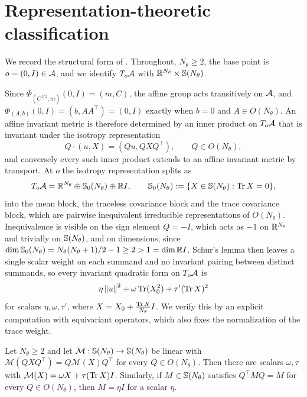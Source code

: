\section{Representation-theoretic classification}\label{app:classification}

We record the structural form of . Throughout, $N_\theta \geq 2$, the base point is $o = (0, I) \in \mathcal{A}$, and we identify $T_o \mathcal{A}$ with $\mathbb{R}^{N_\theta} \times \mathbb{S}(N_\theta)$.

Since $\Phi_{(C^{1/2}, m)}(0, I) = (m, C)$, the affine group acts transitively on $\mathcal{A}$, and $\Phi_{(A,b)}(0, I) = (b, AA^\top) = (0, I)$ exactly when $b = 0$ and $A \in O(N_\theta)$. An affine invariant metric is therefore determined by an inner product on $T_o \mathcal{A}$ that is invariant under the isotropy representation
\begin{equation}\label{eq:app-cl-isotropy}
    Q \cdot (u, X) = (Qu, QXQ^\top), \qquad Q \in O(N_\theta),
\end{equation}
and conversely every such inner product extends to an affine invariant metric by transport. At $o$ the isotropy representation splits as
\begin{equation}\label{eq:app-cl-splitting}
    T_o \mathcal{A} = \mathbb{R}^{N_\theta} \oplus \mathbb{S}_0(N_\theta) \oplus \mathbb{R} I, \qquad \mathbb{S}_0(N_\theta) := \{ X \in \mathbb{S}(N_\theta) : \operatorname{Tr} X = 0 \},
\end{equation}
into the mean block, the traceless covariance block and the trace covariance block, which are pairwise inequivalent irreducible representations of $O(N_\theta)$. Inequivalence is visible on the sign element $Q = -I$, which acts as $-1$ on $\mathbb{R}^{N_\theta}$ and trivially on $\mathbb{S}(N_\theta)$, and on dimensions, since $\dim \mathbb{S}_0(N_\theta) = N_\theta(N_\theta+1)/2 - 1 \geq 2 > 1 = \dim \mathbb{R} I$. Schur's lemma then leaves a single scalar weight on each summand and no invariant pairing between distinct summands, so every invariant quadratic form on $T_o\mathcal{A}$ is
\begin{equation}\label{eq:app-cl-form}
    \eta \left\lVert u\right\rVert^2 + \omega \operatorname{Tr} (X_0^2) + \tau' (\operatorname{Tr} X)^2
\end{equation}
for scalars $\eta, \omega, \tau'$, where $X = X_0 + \frac{\operatorname{Tr} X}{N_\theta} I$. We verify this by an explicit computation with equivariant operators, which also fixes the normalization of the trace weight.

\begin{lemma}\label{lem:app-cl-equivariant}
    Let $N_\theta \geq 2$ and let $\mathcal{M} : \mathbb{S}(N_\theta) \to \mathbb{S}(N_\theta)$ be linear with $\mathcal{M}(QXQ^\top) = Q \mathcal{M}(X) Q^\top$ for every $Q \in O(N_\theta)$. Then there are scalars $\omega, \tau$ with $\mathcal{M}(X) = \omega X + \tau (\operatorname{Tr} X) I$. Similarly, if $M \in \mathbb{S}(N_\theta)$ satisfies $Q^\top M Q = M$ for every $Q \in O(N_\theta)$, then $M = \eta I$ for a scalar $\eta$.
\end{lemma}

